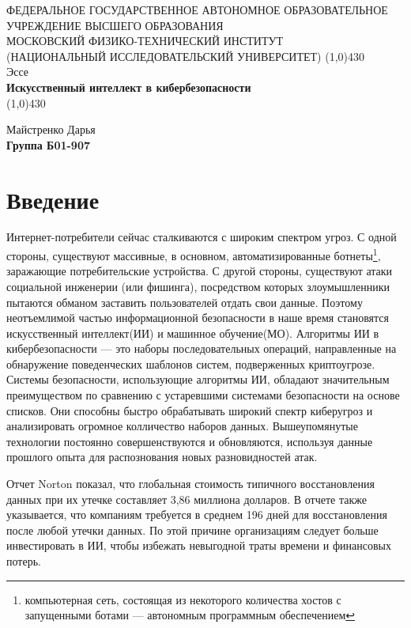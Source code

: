 \documentclass{article}
\begin{document}
	\begin{titlepage}
		\begin{center}
			\large{\small ФЕДЕРАЛЬНОЕ ГОСУДАРСТВЕННОЕ АВТОНОМНОЕ ОБРАЗОВАТЕЛЬНОЕ\\ УЧРЕЖДЕНИЕ ВЫСШЕГО ОБРАЗОВАНИЯ\\ МОСКОВСКИЙ ФИЗИКО-ТЕХНИЧЕСКИЙ ИНСТИТУТ\\ (НАЦИОНАЛЬНЫЙ ИССЛЕДОВАТЕЛЬСКИЙ УНИВЕРСИТЕТ)}
			\vfill
			\line(1,0){430}\\[1mm]
			\huge{Эссе}\\
			\huge\textbf{Искусственный интеллект в кибербезопасности}\\
			\line(1,0){430}\\[1mm]
			\vfill
			\begin{flushright}
				\normalsize{Майстренко Дарья}\\
				\normalsize{\textbf{Группа Б01-907}}\\
			\end{flushright}
		\end{center}
	\end{titlepage}
	
	\section*{Введение}
	Интернет-потребители сейчас сталкиваются с широким спектром угроз. С одной стороны, существуют массивные, в основном, автоматизированные ботнеты\footnote{компьютерная сеть, состоящая из некоторого количества хостов с запущенными ботами — автономным программным обеспечением}, заражающие потребительские устройства. С другой стороны, существуют атаки социальной инженерии (или фишинга), посредством которых злоумышленники пытаются обманом заставить пользователей отдать свои данные. Поэтому неотъемлимой частью информационной безопасности в наше время становятся искусственный интеллект(ИИ) и машинное обучение(МО). Алгоритмы ИИ в кибербезопасности — это наборы последовательных операций, направленные на обнаружение поведенческих шаблонов систем, подверженных криптоугрозе. Системы безопасности, использующие алгоритмы ИИ, обладают значительным преимуществом по сравнению с устаревшими системами безопасности на основе списков. Они способны быстро обрабатывать широкий спектр киберугроз и анализировать огромное колличество наборов данных. Вышеупомянутые технологии постоянно совершенствуются и обновляются, используя данные прошлого опыта для распознования новых разновидностей атак.
 \par
	Отчет Norton показал, что глобальная стоимость типичного восстановления данных при их утечке составляет 3,86 миллиона долларов. В отчете также указывается, что компаниям требуется в среднем 196 дней для восстановления после любой утечки данных. По этой причине организациям следует больше инвестировать в ИИ, чтобы избежать невыгодной траты времени и финансовых потерь.
	
\end{document}
